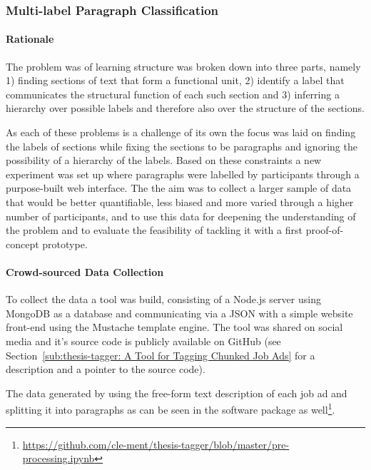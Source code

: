 \subsubsection{Multi-label Paragraph Classification}
\label{subs:Multi-label Paragraph Classification}

\paragraph{Rationale}
\label{par:Rationale}

The problem was of learning structure was broken down into three parts, namely 1) finding sections of text that form a functional unit, 2) identify a label that communicates the structural function of each such section and 3) inferring a hierarchy over possible labels and therefore also over the structure of the sections.

As each of these problems is a challenge of its own the focus was laid on finding the labels of sections while fixing the sections to be paragraphs and ignoring the possibility of a hierarchy of the labels. Based on these constraints a new experiment was set up where paragraphs were labelled by participants through a purpose-built web interface. The the aim was to collect a larger sample of data that would be better quantifiable, less biased and more varied through a higher number of participants, and to use this data for deepening the understanding of the problem and to evaluate the feasibility of tackling it with a first proof-of-concept prototype.


\paragraph{Crowd-sourced Data Collection}
\label{par:Crowd-sourced Data Collection}

To collect the data a tool was build, consisting of a \gls{Node.js} server using \gls{MongoDB} as a database and communicating via a JSON with a simple website front-end using the \gls{Mustache} template engine.
The tool was shared on social media and it's source code is publicly available on \gls{GitHub} (see Section~\ref{sub:thesis-tagger: A Tool for Tagging Chunked Job Ads} for a description and a pointer to the source code).

The data generated by using the free-form text description of each job ad and splitting it into paragraphs as can be seen in the software package as well\footnote{\url{https://github.com/cle-ment/thesis-tagger/blob/master/pre-processing.ipynb}}.

